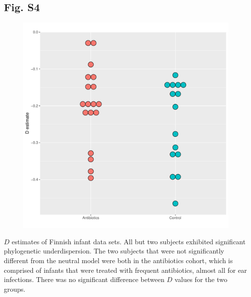 \documentclass{article}
\begin{document}
{\subsection{Fig. S4}\label{sec:figureS4}
\begin{figure}[ht]
	\centering
	\includegraphics[scale=0.80]{figs/Fig_S4.pdf}
\end{figure}
\(D\) estimates of Finnish infant data sets. All but two subjects exhibited significant phylogenetic underdispersion. The two subjects that were not significantly different from the neutral model were both in the antibiotics cohort, which is comprised of infants that were treated with frequent antibiotics, almost all for ear infections. There was no significant difference between \(D\) values for the two groups. 
\newpage

}
\end{document}
